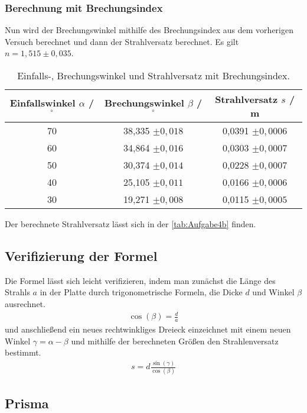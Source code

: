 \subsubsection{Berechnung mit Brechungsindex}

Nun wird der Brechungswinkel mithilfe des Brechungsindex aus dem vorherigen Versuch berechnet und dann
der Strahlversatz berechnet. Es gilt $n = 1,515 \pm 0,035$.
\begin{table}
  \centering
  \caption{Einfalls-, Brechungswinkel und Strahlversatz mit Brechungsindex.}
  \label{tab:Aufgabe4b}
  \begin{tabular}{c c c}
    \toprule
    Einfallswinkel $\alpha$ / $^{\circ}$& Brechungswinkel $\beta$ / $^{\circ}$ & Strahlversatz $s$ / m\\
    \midrule
    70 & 38,335 $\pm 0,018$ & 0,0391 $\pm 0,0006$\\
    60 & 34,864 $\pm 0,016$ & 0,0303 $\pm 0,0007$\\
    50 & 30,374 $\pm 0,014$ & 0,0228 $\pm 0,0007$\\
    40 & 25,105 $\pm 0,011$ & 0,0166 $\pm 0,0006$\\
    30 & 19,271 $\pm 0,008$ & 0,0115 $\pm 0,0005$\\
    \bottomrule
  \end{tabular}
\end{table}

Der berechnete Strahlversatz lässt sich in der \autoref{tab:Aufgabe4b} finden.\\

\subsection{Verifizierung der Formel}
 
Die Formel lässt sich leicht verifizieren, indem man zunächst die Länge des Strahls $a$ in der Platte durch trigonometrische Formeln, die Dicke $d$ und Winkel $\beta$ ausrechnet.\\
\begin{align}
  \cos(\beta) = \frac{d}{a}
\end{align}
und anschließend ein neues rechtwinkliges Dreieck einzeichnet mit einem neuen Winkel $\gamma = \alpha - \beta$ und mithilfe der berechneten Größen den
Strahlenversatz bestimmt.
\begin{align}
  \label{eqn:Geschw}
  s = d \frac{\sin(\gamma)}{\cos(\beta)}
\end{align}

\subsection{Prisma}


